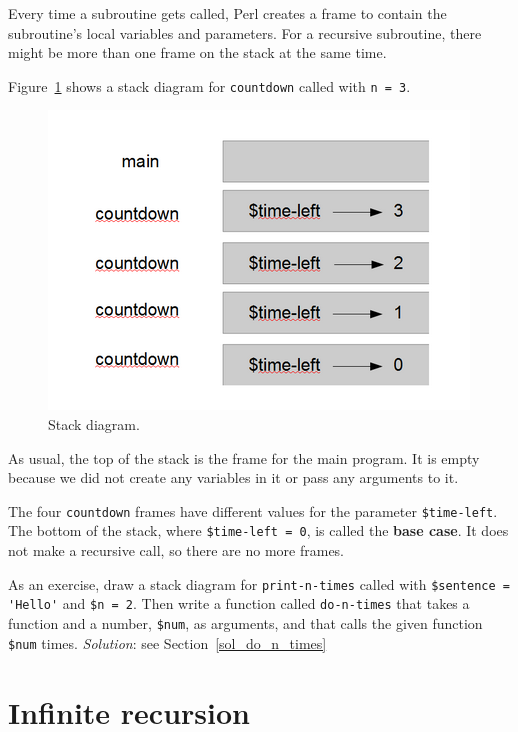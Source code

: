 Every time a subroutine gets called, Perl creates a
frame to contain the subroutine's local variables and parameters.
For a recursive subroutine, there might be more than one frame 
on the stack at the same time.

Figure~\ref{fig.stack2} shows a stack diagram for {\tt countdown} called with
{\tt n = 3}.

\begin{figure}
\centerline
{\includegraphics[scale=0.6]{figs/stack2.png}}
\caption{Stack diagram.}
\label{fig.stack2}
\end{figure}


As usual, the top of the stack is the frame for the main 
program.
It is empty because we did not create any variables in 
it or pass any arguments to it.

The four {\tt countdown} frames have different values for the
parameter {\tt \$time-left}.  The bottom of the stack, where {\tt \$time-left = 0}, is
called the {\bf base case}.  It does not make a recursive call, so
there are no more frames.

As an exercise, draw a stack diagram for \verb"print-n-times" 
called with
\verb"$sentence = 'Hello'" and {\tt \$n = 2}.
Then write a function called \verb"do-n-times" that takes a function
and a number, {\tt \$num}, as arguments, and that calls
the given function {\tt \$num} times.
\label{do_n_times}
\emph{Solution}: see Section~\ref{sol_do_n_times}


\section{Infinite recursion}


